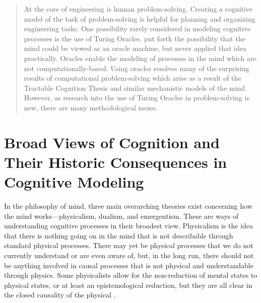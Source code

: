 
\begin{abstract}
At the core of engineering is human problem-solving.  Creating a cognitive model of the task of problem-solving is helpful for planning and organizing engineering tasks.  One possibility rarely considered in modeling cognitive processes is the use of Turing Oracles.  \citet{copeland1998} put forth the possibility that the mind could be viewed as an oracle machine, but never applied that idea practically.  Oracles enable the modeling of processes in the mind which are not computationally-based.  Using oracles resolves many of the surprising results of computational problem-solving which arise as a result of the Tractable Cognition Thesis and similar mechanistic models of the mind.  However, as research into the use of Turing Oracles in problem-solving is new, there are many methodological issues.
\end{abstract}

\section[Broad Views of Cognition]{Broad Views of Cognition and Their Historic Consequences in Cognitive Modeling}

In the philosophy of mind, three main overarching theories exist concerning how the mind works---physicalism, dualism, and emergentism.  These are ways of understanding cognitive processes in their broadest view.  Physicalism is the idea that there is nothing going on in the mind that is not describable through standard physical processes.  There may yet be physical processes that we do not currently understand or are even aware of, but, in the long run, there should not be anything involved in causal processes that is not physical and understandable through physics.  Some physicalists allow for the non-reduction of mental states to physical states, or at least an epistemological reduction, but they are all clear in the closed causality of the physical \citep{horgan1994}.

